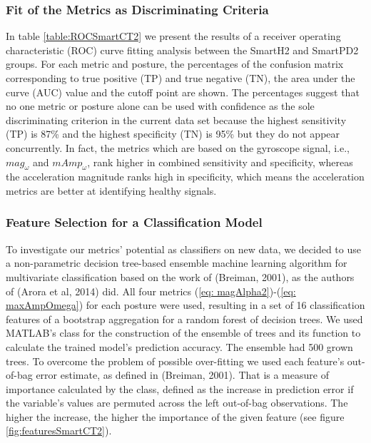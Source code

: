 \subsubsection{Fit of the Metrics as Discriminating Criteria}
\label{subsubsec:PenCTMetricsFit}
In table \ref{table:ROCSmartCT2} we present the results of a receiver operating characteristic (\gls{ROC}) curve fitting analysis between the \gls{SmartH2} and \gls{SmartPD2} groups. For each metric and posture, the percentages of the confusion matrix corresponding to true positive (\gls{TP}) and true negative (\gls{TN}), the area under the curve (\gls{AUC}) value and the cutoff point are shown. The percentages suggest that no one metric or posture alone can be used with confidence as the sole discriminating criterion in the current data set because the highest sensitivity (\gls{TP}) is 87\% and the highest specificity (\gls{TN}) is 95\% but they do not appear concurrently. In fact, the metrics which are based on the gyroscope signal, i.e., $mag_{\omega}$ and $mAmp_{\omega}$, rank higher in combined sensitivity and specificity, whereas the acceleration magnitude ranks high in specificity, which means the acceleration metrics are better at identifying healthy signals. 


\subsubsection{Feature Selection for a Classification Model}
\label{subsubsec:PenCTFeatures}
To investigate our metrics' potential as classifiers on new data, we decided to use a non-parametric decision tree-based ensemble machine learning algorithm for multivariate classification based on the work of (Breiman, 2001), as the authors of (Arora et al, 2014) did. All four metrics (\ref{eq: magAlpha2})-(\ref{eq: maxAmpOmega}) for each posture were used, resulting in a set of 16 classification features of a bootstrap aggregation for a random forest of decision trees. We used MATLAB’s  class for the construction of the ensemble of trees and its function  to calculate the trained model's prediction accuracy. The ensemble had 500 grown trees. To overcome the problem of possible over-fitting we used each feature's out-of-bag error estimate, as defined in (Breiman, 2001). That is a measure of importance calculated by the  class, defined as the increase in prediction error if the variable's values are permuted across the left out-of-bag observations. The higher the increase, the higher the importance of the given feature (see figure \ref{fig:featuresSmartCT2}). 

